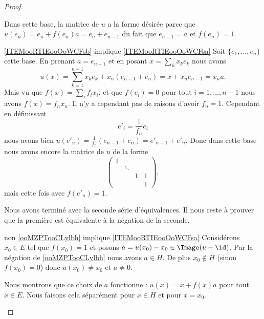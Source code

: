 \begin{proof}
\begin{subproof}
            Dans cette base, la matrice de \( u\) a la forme désirée parce que \( u(e_n)=e_n+f(e_n)a=e_n+e_{n-1}\) du fait que \( e_{n-1}=a\) et \( f(e_n)=1\).
        \item[\ref{ITEMooRTIEooOoWCFsb} implique \ref{ITEMooRTIEooOoWCFsa}]
            Soit \( \{ e_1,\ldots, e_n \}\) cette base. En prenant \( a=e_{n-1}\) et en posant \( x=\sum_kx_ke_k\) nous avons
            \begin{equation}
                u(x)=\sum_{k=1}^{n-1}x_ke_k+x_n(e_{n-1}+e_n)=x+x_ne_{n-1}=x_na.
            \end{equation}
            Mais vu que \( f(x)=\sum_if_ix_i\), et que \( f(e_i)=0\) pour tout \( i=1,\ldots, n-1\) nous avons \( f(x)=f_nx_n\). Il n'y a cependant pas de raisons d'avoir \( f_n=1\). Cependant en définissant
            \begin{equation}
                e'_i=\frac{1}{ f_n }e_i
            \end{equation}
            nous avons bien \( u(e'_n)=\frac{1}{ f_n }(e_{n-1}+e_n)=e'_{n-1}+e'_n\). Donc dans cette base nous avons encore la matrice de \( u\) de la forme
            \begin{equation}
                \begin{pmatrix}
                     1   &       &       &       \\
                        &   \ddots    &       &       \\
                        &       &   1    &   1    \\ 
                        &       &       &   1     
                 \end{pmatrix},
            \end{equation}
            mais cette fois avec \( f(e'_n)=1\).
    \end{subproof}
    Nous avons terminé avec la seconde série d'équivalences. Il nous reste à prouver que la première est équivalente à la négation de la seconde.
    \begin{subproof}
        \item[non \ref{ooMZPTooCLylbh} implique \ref{ITEMooRTIEooOoWCFsa}]
            Considérons \( x_0\in E\) tel que \( f(x_0)=1\) et posons \( a=u(x_0)-x_0\in\Image(u-\id)\). Par la négation de \ref{ooMZPTooCLylbh} nous avons \( a\in H\). De plus \( x_0\notin H\) (sinon \( f(x_0)=0\)) donc \( u(x_0)\neq x_0\) et \( a\neq 0\).

            Nous montrons que ce choix de \( a\) fonctionne : \( u(x)=x+f(x)a\) pour tout \( x\in E\). Nous faisons cela séparément pour \( x\in H\) et pour \( x=x_0\). 


\end{subproof}
\end{proof}
